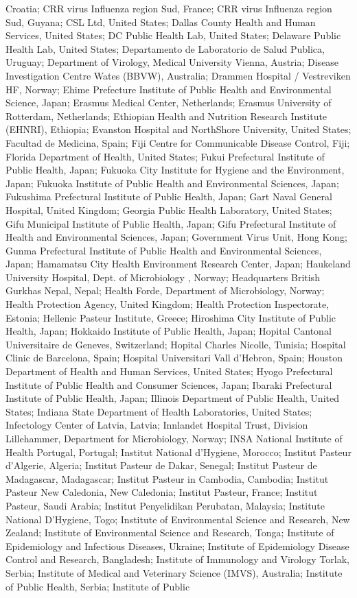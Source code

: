 Croatia; CRR virus Influenza region Sud, France; CRR virus Influenza region Sud, Guyana; CSL Ltd, United States; Dallas County Health and Human Services, United States; DC Public Health Lab, United States; Delaware Public Health Lab, United States; Departamento de Laboratorio de Salud Publica, Uruguay; Department of Virology, Medical University Vienna, Austria; Disease Investigation Centre Wates (BBVW), Australia; Drammen Hospital / Vestreviken HF, Norway; Ehime Prefecture Institute of Public Health and Environmental Science, Japan; Erasmus Medical Center, Netherlands; Erasmus University of Rotterdam, Netherlands; Ethiopian Health and Nutrition Research Institute (EHNRI), Ethiopia; Evanston Hospital and NorthShore University, United States; Facultad de Medicina, Spain; Fiji Centre for Communicable Disease Control, Fiji; Florida Department of Health, United States; Fukui Prefectural Institute of Public Health, Japan; Fukuoka City Institute for Hygiene and the Environment, Japan; Fukuoka Institute of Public Health and Environmental Sciences, Japan; Fukushima Prefectural Institute of Public Health, Japan; Gart Naval General Hospital, United Kingdom; Georgia Public Health Laboratory, United States; Gifu Municipal Institute of Public Health, Japan; Gifu Prefectural Institute of Health and Environmental Sciences, Japan; Government Virus Unit, Hong Kong; Gunma Prefectural Institute of Public Health and Environmental Sciences, Japan; Hamamatsu City Health Environment Research Center, Japan; Haukeland University Hospital, Dept. of Microbiology , Norway; Headquarters British Gurkhas Nepal, Nepal; Health Forde, Department of Microbiology, Norway; Health Protection Agency, United Kingdom; Health Protection Inspectorate, Estonia; Hellenic Pasteur Institute, Greece; Hiroshima City Institute of Public Health, Japan; Hokkaido Institute of Public Health, Japan; Hopital Cantonal Universitaire de Geneves, Switzerland; Hopital Charles Nicolle, Tunisia; Hospital Clinic de Barcelona, Spain; Hospital Universitari Vall d'Hebron, Spain; Houston Department of Health and Human Services, United States; Hyogo Prefectural Institute of Public Health and Consumer Sciences, Japan; Ibaraki Prefectural Institute of Public Health, Japan; Illinois Department of Public Health, United States; Indiana State Department of Health Laboratories, United States; Infectology Center of Latvia, Latvia; Innlandet Hospital Trust, Division Lillehammer, Department for Microbiology, Norway; INSA National Institute of Health Portugal, Portugal; Institut National d'Hygiene, Morocco; Institut Pasteur d'Algerie, Algeria; Institut Pasteur de Dakar, Senegal; Institut Pasteur de Madagascar, Madagascar; Institut Pasteur in Cambodia, Cambodia; Institut Pasteur New Caledonia, New Caledonia; Institut Pasteur, France; Institut Pasteur, Saudi Arabia; Institut Penyelidikan Perubatan, Malaysia; Institute National D'Hygiene, Togo; Institute of Environmental Science and Research, New Zealand; Institute of Environmental Science and Research, Tonga; Institute of Epidemiology and Infectious Diseases, Ukraine; Institute of Epidemiology Disease Control and Research, Bangladesh; Institute of Immunology and Virology Torlak, Serbia; Institute of Medical and Veterinary Science (IMVS), Australia; Institute of Public Health, Serbia; Institute of Public 